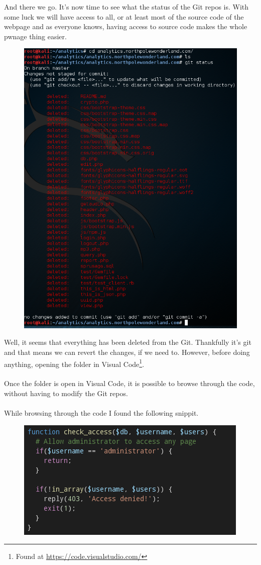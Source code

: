 \documentclass[writeup.tex]{subfiles}
\begin{document}
			And there we go. It's now time to see what the status of the Git repos is. With some luck we will have access to all, or at least most of the source code of the webpage and as everyone knows, having access to source code makes the whole pwnage thing easier.
			\begin{figure}[H]
				\centering
				\includegraphics[width=.8\linewidth]{"screenshots/pwns/Site 7 - git status"}
			\end{figure}
			
			Well, it seems that everything has been deleted from the Git. Thankfully it's git and that means we can revert the changes, if we need to. However, before doing anything, opening the folder in Visual Code\footnote{Found at \url{https://code.visualstudio.com/}}.\\
			\\
			Once the folder is open in Visual Code, it is possible to browse through the code, without having to modify the Git repos.\\
			\\
			While browsing through the code I found the following snippit.
			\begin{figure}[H]
				\centering
				\includegraphics[scale=1]{"screenshots/pwns/Site 7 - check_access"}
			\end{figure}
			
\end{document}
